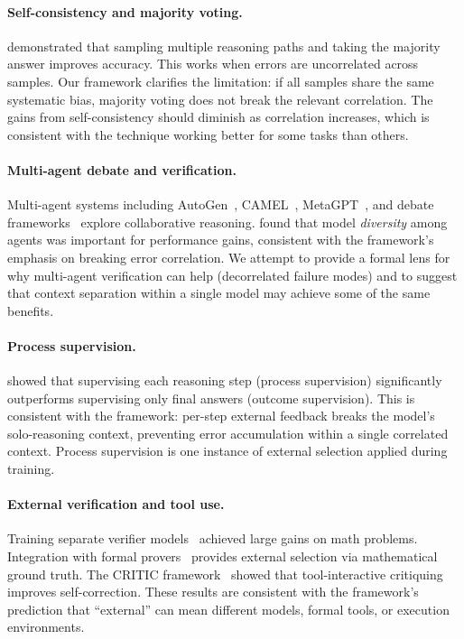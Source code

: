 \documentclass[11pt]{article}
\begin{document}
\paragraph{Self-consistency and majority voting.} \citet{wang2023selfconsistency} demonstrated that sampling multiple reasoning paths and taking the majority answer improves accuracy. This works when errors are uncorrelated across samples. Our framework clarifies the limitation: if all samples share the same systematic bias, majority voting does not break the relevant correlation. The gains from self-consistency should diminish as correlation increases, which is consistent with the technique working better for some tasks than others.

\paragraph{Multi-agent debate and verification.} Multi-agent systems including AutoGen~\citep{wu2023autogen}, CAMEL~\citep{li2023camel}, MetaGPT~\citep{hong2023metagpt}, and debate frameworks~\citep{du2023debate, liang2023debate} explore collaborative reasoning. \citet{chen2024reconcile} found that model \textit{diversity} among agents was important for performance gains, consistent with the framework's emphasis on breaking error correlation. We attempt to provide a formal lens for why multi-agent verification can help (decorrelated failure modes) and to suggest that context separation within a single model may achieve some of the same benefits.

\paragraph{Process supervision.} \citet{lightman2023process} showed that supervising each reasoning step (process supervision) significantly outperforms supervising only final answers (outcome supervision). This is consistent with the framework: per-step external feedback breaks the model's solo-reasoning context, preventing error accumulation within a single correlated context. Process supervision is one instance of external selection applied during training.

\paragraph{External verification and tool use.} Training separate verifier models~\citep{cobbe2021verifier} achieved large gains on math problems. Integration with formal provers~\citep{yang2023leandojo, polu2020generative, baba2025prover} provides external selection via mathematical ground truth. The CRITIC framework~\citep{gou2023critic} showed that tool-interactive critiquing improves self-correction. These results are consistent with the framework's prediction that ``external'' can mean different models, formal tools, or execution environments.
\end{document}

